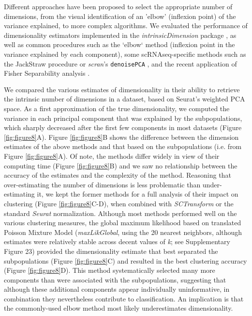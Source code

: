 \documentclass{bmcart}
\begin{document}
Different approaches have been proposed to select the appropriate number of dimensions, from the visual identification of an 'elbow' (inflexion point) of the variance explained, to more complex algorithms. We evaluated the performance of dimensionality estimators implemented in the \textit{intrinsicDimension} package \cite{johnssonDimensionality2015}, as well as common procedures such as the `elbow` method (inflexion point in the variance explained by each component), some scRNAseq-specific methods such as the JackStraw procedure \cite{ChungJackstraw2015} or \textit{scran}'s \texttt{denoisePCA} \cite{LunScran2016}, and the recent application of Fisher Separability analysis \cite{AlberganteSepar2019}.

We compared the various estimates of dimensionality in their ability to retrieve the intrinsic number of dimensions in a dataset, based on Seurat's weighted PCA space. As a first approximation of the true dimensionality, we computed the variance in each principal component that was explained by the subpopulations, which sharply decreased after the first few components in most datasets (Figure \ref{fig:figure8}A). Figure \ref{fig:figure8}B shows the difference between the dimension estimates of the above methods and that based on the subpopulations (i.e. from Figure \ref{fig:figure8}A). Of note, the methods differ widely in view of their computing time (Figure \ref{fig:figure8}B) and we saw no relationship between the accuracy of the estimates and the complexity of the method. Reasoning that over-estimating the number of dimensions is less problematic than under-estimating it, we kept the former methods for a full analysis of their impact on clustering (Figure \ref{fig:figure8}C-D), when combined with \textit{SCTransform} or the standard \textit{Seurat} normalization. Although most methods performed well on the various clustering measures, the global maximum likelihood based on translated Poisson Mixture Model (\textit{maxLikGlobal}, using the 20 nearest neighbors, although estimates were relatively stable across decent values of \textit{k}; see Supplementary Figure 23) provided the dimensionality estimate that best separated the subpopulations (Figure \ref{fig:figure8}C) and resulted in the best clustering accuracy (Figure \ref{fig:figure8}D). This method systematically selected many more components than were associated with the subpopulations, suggesting that although these additional components appear individually uninformative, in combination they nevertheless contribute to classification. An implication is that the commonly-used elbow method most likely underestimates dimensionality.
\end{document}
